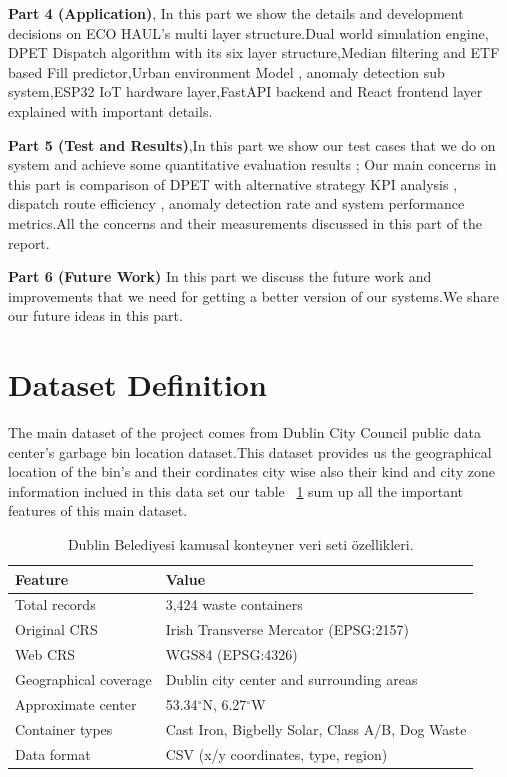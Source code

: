 \documentclass[12pt,a4paper]{report}
\begin{document}
\indent \textbf{Part 4 (Application)}, In this part we show the details and development decisions on ECO HAUL's multi layer structure.Dual world simulation engine, DPET Dispatch algorithm with its six layer structure,Median filtering and ETF based Fill predictor,Urban environment Model , anomaly detection sub system,ESP32 IoT hardware layer,FastAPI backend and React frontend layer explained with important details.


\indent \textbf {Part 5 (Test and Results)},In this part we show our test cases that we do on system and achieve some quantitative evaluation results ; Our main concerns in this part is comparison of DPET with alternative strategy  KPI analysis , dispatch route efficiency , anomaly detection rate and system performance metrics.All the concerns and their measurements discussed in this part of the report.

\indent  \textbf{Part 6 (Future Work)}
In this part we discuss the future work and improvements that we need for getting a better version of our systems.We share our future ideas in this part.

\section{Dataset Definition}


\indent The main dataset of the project comes from Dublin City Council public data center's garbage bin location dataset.This dataset provides  us the geographical location of the bin's and their cordinates city wise also their kind and city zone information inclued in this data set our table ~\ref{tab:dataset} sum up all the important features of this main dataset.

\begin{table}[H]
\centering
\caption{Dublin Belediyesi kamusal konteyner veri seti özellikleri.}
\label{tab:dataset}
\begin{tabular}{ll}
\toprule
\textbf{Feature} & \textbf{Value} \\
\midrule
Total records        & 3,424 waste containers \\
Original CRS         & Irish Transverse Mercator (EPSG:2157) \\
Web CRS              & WGS84 (EPSG:4326) \\
Geographical coverage & Dublin city center and surrounding areas \\
Approximate center   & 53.34$^\circ$N, 6.27$^\circ$W \\
Container types      & Cast Iron, Bigbelly Solar, Class A/B, Dog Waste \\
Data format          & CSV (x/y coordinates, type, region) \\
\bottomrule
\end{tabular}
\end{table}
\end{document}
